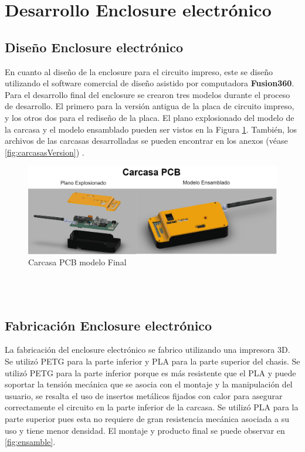
\section{Desarrollo Enclosure electrónico}
\subsection{Diseño Enclosure electrónico}

En cuanto al diseño de la enclosure para el circuito impreso, este se diseño utilizando el software comercial de diseño asistido por computadora \textbf{Fusion360}. Para el desarrollo final del enclosure se crearon tres modelos durante el proceso de desarrollo. El primero para la versión antigua de la placa de circuito impreso, y los otros dos para el rediseño de la placa. El plano explosionado del modelo de la carcasa y el modelo ensamblado pueden ser vistos en la Figura \ref{fig:carcasa}. También, los archivos de las carcasas desarrolladas se pueden encontrar en los anexos (véase \ref{fig:carcasasVersion}) .
\vspace{5 px}
\begin{figure}[H]
    \centering
    \includegraphics[width=\textwidth]{Imagenes/Metodologia/carcasa.png}
    \caption{Carcasa PCB modelo Final}
    \label{fig:carcasa}
\end{figure}

\\ \\
\subsection{Fabricación Enclosure electrónico}

La fabricación del enclosure electrónico se fabrico utilizando una impresora 3D. Se utilizó PETG para la parte inferior y PLA para la parte superior del chasis. Se utilizó PETG para la parte inferior porque es más resistente que el PLA y puede soportar la tensión mecánica que se asocia con el montaje y la manipulación del usuario, se resalta el uso de insertos metálicos fijados con calor para asegurar correctamente el circuito en la parte inferior de la carcasa. Se utilizó PLA para la parte superior pues esta no requiere de gran resistencia mecánica asociada a su uso y tiene menor densidad. El montaje y producto final se puede observar en \ref{fig:ensamble}. 


